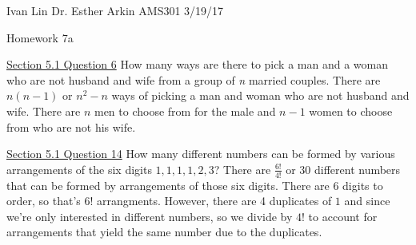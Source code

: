 \documentclass{article}
\begin{document}
Ivan Lin\newline{}
Dr. Esther Arkin\newline{}
AMS301\newline{}
3/19/17

\begin{center}
  Homework 7a
\end{center}

\underline{Section 5.1 Question 6}\newline{}
How many ways are there to pick a man and a woman who are not husband and wife from a group of \textit{n} married couples.\newline{}
There are $n(n-1)$ or $n^2-n$ ways of picking a man and woman who are not husband and wife. There are $n$ men to choose from for the male and $n-1$ women to choose from who are not his wife.\newline{}\newline{}

\underline{Section 5.1 Question 14}\newline{}
How many different numbers can be formed by various arrangements of the six digits $1, 1, 1, 1, 2, 3$?\newline{}
There are $\frac{6!}{4!}$ or $30$ different numbers that can be formed by arrangements of those six digits. There are $6$ digits to order, so that's $6!$ arrangments. However, there are 4 duplicates of $1$ and since we're only interested in different numbers, so we divide by $4!$ to account for arrangements that yield the same number due to the duplicates.\newline{}\newline{}
\end{document}
